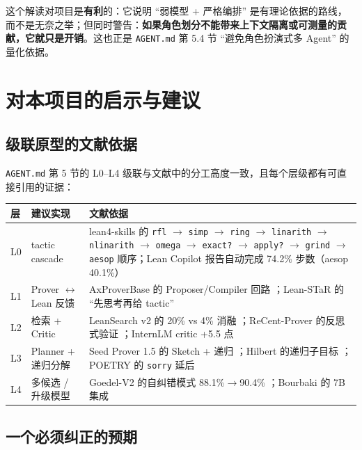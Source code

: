 \documentclass[UTF8,a4paper,11pt,fontset=windows]{ctexart}
\newcommand{\code}[1]{\texttt{#1}}
\begin{document}
这个解读对项目是\textbf{有利}的：它说明 ``弱模型 + 严格编排'' 是有理论依据的路线，而不是无奈之举；但同时警告：\textbf{如果角色划分不能带来上下文隔离或可测量的贡献，它就只是开销}。这也正是 \code{AGENT.md} 第 5.4 节 ``避免角色扮演式多 Agent'' 的量化依据。

\section{对本项目的启示与建议}

\subsection{级联原型的文献依据}\label{sec:cascade}

\code{AGENT.md} 第 5 节的 L0--L4 级联与文献中的分工高度一致，且每个层级都有可直接引用的证据：

\begin{center}
\small
\begin{tabular}{@{}p{1.1cm}p{3.4cm}p{9.8cm}@{}}
\toprule
\textbf{层} & \textbf{建议实现} & \textbf{文献依据} \\
\midrule
L0 & tactic cascade & lean4-skills 的 \code{rfl} $\rightarrow$ \code{simp} $\rightarrow$ \code{ring} $\rightarrow$ \code{linarith} $\rightarrow$ \code{nlinarith} $\rightarrow$ \code{omega} $\rightarrow$ \code{exact?} $\rightarrow$ \code{apply?} $\rightarrow$ \code{grind} $\rightarrow$ \code{aesop} 顺序；Lean Copilot 报告自动完成 74.2\% 步数（aesop 40.1\%）\cite{leancopilot} \\
L1 & Prover $\leftrightarrow$ Lean 反馈 & AxProverBase 的 Proposer/Compiler 回路 \cite{axprover}；Lean-STaR 的 ``先思考再给 tactic'' \cite{leanstar} \\
L2 & 检索 + Critic & LeanSearch v2 的 20\% vs 4\% 消融 \cite{leansearchv2}；ReCent-Prover 的反思式验证 \cite{recent}；InternLM critic +5.5 点 \cite{internlm} \\
L3 & Planner + 递归分解 & Seed Prover 1.5 的 Sketch + 递归 \cite{seedprover}；Hilbert 的递归子目标 \cite{hilbert}；POETRY 的 \code{sorry} 延后 \cite{poetry} \\
L4 & 多候选 / 升级模型 & Goedel-V2 的自纠错模式 88.1\%$\rightarrow$90.4\% \cite{goedelv2}；Bourbaki 的 7B 集成 \cite{bourbaki} \\
\bottomrule
\end{tabular}
\end{center}

\subsection{一个必须纠正的预期}
\end{document}
